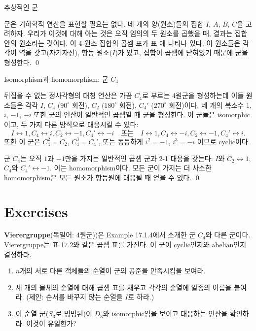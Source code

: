 \begin{example}
	\textsf{추상적인 군}
	
	군은 기하학적 연산을 표현할 필요는 없다. 네 개의 양(원소)들의 집합 $I$, $A$, $B$, $C$을 고려하자. 우리가 이것에 대해 아는 것은 오직 임의의 두 원소를 곱했을 때, 결과는 집합 안의 원소라는 것이다. 이 4-원소 집합의 곱셈 표가 표 에 나타나 있다. 이 원소들은 각각이 역을 갖고(자기자신), 항등 원소($I$)가 있고, 집합이 곱셈에 닫혀있기 때문에 군을 형성한다.
	\qed
\end{example}

\begin{example}
	\textsf{Isomorphism과 homomorphism: 군 $C_4$}
	
	뒤집을 수 없는 정사각형의 대칭 연산은 가끔 $C_4$로 부르는 4원군을 형성하는데 이들 원소들은 각각 $I$, $C_4$ ($90^\circ$ 회전), $C_2$ ($180^\circ$ 회전), $C_4'$ ($270^\circ$ 회전)이다. 네 개의 복소수 $1$, $i$, $-1$, $-i$ 또한 군의 연산이 일반적인 곱셈일 때 군을 형성한다. 이 군들은 isomorphic이고, 두 가지 다른 방식으로 대응시킬 수 있다:
	\begin{equation*}
		I \leftrightarrow 1, C_4 \leftrightarrow i, C_2 \leftrightarrow -1, C_4' \leftrightarrow -i \quad\text{또는}\quad I \leftrightarrow 1, C_4 \leftrightarrow -i, C_2 \leftrightarrow -1, C_4' \leftrightarrow i.
	\end{equation*}
	또한 이 군은 $C_4^2 = C_2$, $C_4^3 = C_4'$, 또는 동등하게 $i^2 = -1$, $i^3 = -i$ 이므로 cyclic이다.
	
	군 $C_4$는 오직 $1$과 $-1$만을 가지는 일반적인 곱셈 군과 2-1 대응을 갖는다: $I$와 $C_2 \leftrightarrow 1$, $C_4$와 $C_4'\leftrightarrow -1$. 이는 homomorphism이다. 모든 군이 가지는 더 사소한 homomorphism은 모든 원소가 항등원에 대응될 때 얻을 수 있다. \qed
\end{example}

\section*{Exercises}

\begin{question}
	\textbf{Vierergruppe}(독일어: 4원군))은 Example 17.1.4에서 소개한 군 $C_4$와 다른 군이다. Vierergruppe는 표 17.2와 같은 곱셈 표를 가진다. 이 군이 cyclic인지와 abelian인지 결정하라.
\end{question}

\begin{question}
	\vspace{-2.0em}
	\begin{enumerate}[label=(\alph*), leftmargin=*, parsep=0em, topsep=0pt]
		\item $n$개의 서로 다른 객체들의 순열이 군의 공준을 만족시킴을 보여라.
		\item 세 개의 물체의 순열에 대해 곱셈 표를 채우고 각각의 순열에 일종의 이름을 붙여라. (제안: 순서를 바꾸지 않는 순열을 $I$로 하라.)
		\item 이 순열 군($S_3$로 명명된)이 $D_3$와 isomorphic임을 보이고 대응하는 연산을 확인하라. 이것이 유일한가?
	\end{enumerate}
\end{question}

